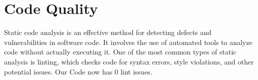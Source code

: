 \section{Code Quality}

Static code analysis is an effective method for detecting defects and vulnerabilities in software code. It involves the use of automated tools to analyze code without actually executing it. One of the most common types of static analysis is linting, which checks code for syntax errors, style violations, and other potential issues. Our Code now has 0 lint issues.



